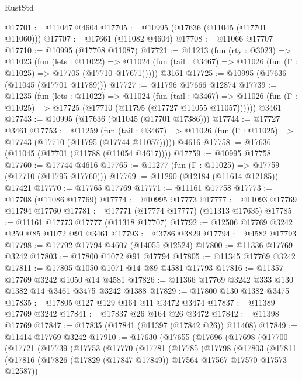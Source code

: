 \begin{lexlean}{RustStd}
\begin{coremodule}
@17701 := @11047 @4604
@17705 := @10995 (@17636 (@11045 (@17701 @11060)))
@17707 := @17661 (@11082 @4604)
@17708 := @11066 @17707
@17710 := @10995 (@17708 @11087)
@17721 := @11213
    (fun (rty : @3023) =>
    @11023
      (fun (lets : @11022) =>
      @11024 (fun (tail : @3467) => @11026 (fun (Γ : @11025) => @17705 (@17710 @17671)))))
    @3161
@17725 := @10995 (@17636 (@11045 (@17701 @11789)))
@17727 := @11796 @17666 @12874
@17739 := @11235
    (fun (lets : @11022) =>
    @11024
      (fun (tail : @3467) =>
      @11026 (fun (Γ : @11025) => @17725 (@17710 (@11795 (@17727 @11055 @11057))))))
    @3461
@17743 := @10995 (@17636 (@11045 (@17701 @17386)))
@17744 := @17727 @3461
@17753 := @11259
    (fun (tail : @3467) => @11026 (fun (Γ : @11025) => @17743 (@17710 (@11795 (@17744 @11057)))))
    @4616
@17758 := @17636 (@11045 (@17701 (@11788 (@11054 @4617))))
@17759 := @10995 @17758
@17760 := @17744 @4616
@17765 := @11277 (fun (Γ : @11025) => @17759 (@17710 (@11795 @17760)))
@17769 := @11290 (@12184 (@11614 @12185)) @17421
@17770 := @17765 @17769
@17771 := @11161 @17758
@17773 := @17708 (@11086 @17769)
@17774 := @10995 @17773
@17777 := @11093 @17769 @11794 @17760
@17781 := @17771 (@17774 @17777) (@11313 @17635)
@17785 := @11161 @17773 @17777 (@11318 @17707)
@17792 := @12506 @17769 @3242 @259 @85 @1072 @91 @3461
@17793 := @3786 @3829
@17794 := @4582 @17793
@17798 := @17792 @17794 @4607 (@14055 @12524)
@17800 := @11336 @17769 @3242
@17803 := @17800 @1072 @91 @17794
@17805 := @11345 @17769 @3242
@17811 := @17805 @1050 @1071 @14 @89 @4581 @17793
@17816 := @11357 @17769 @3242 @1050 @14 @4581
@17826 := @11366 @17769 @3242 @333 @130 @1382 @14 @3461 @3475 @3242 @1388
@17829 := @17800 @130 @1382 @3475
@17835 := @17805 @127 @129 @164 @11 @3472 @3474
@17837 := @11389 @17769 @3242
@17841 := @17837 @26 @164 @26 @3472
@17842 := @11398 @17769
@17847 := @17835 (@17841 (@11397 (@17842 @26)) @11408)
@17849 := @11414 @17769 @3242
@17910 := @17630
    (@17655
      (@17696
        (@17698
          (@17700
            (@17721
              (@17739
                (@17753
                  (@17770
                    (@17781
                      (@17785
                        (@17798
                          (@17803
                            (@17811
                              (@17816
                                (@17826
                                  (@17829 (@17847 @17849))
                                  @17564
                                  @17567
                                  @17570
                                  @17573
                                  @12587))

\end{coremodule}
\end{lexlean}
